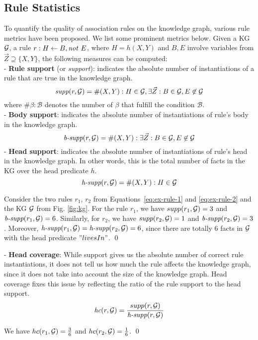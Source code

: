 \subsection{Rule Statistics}
To quantify the quality of association rules on the knowledge graph, various rule metrics have been proposed. We list some prominent metrics below. Given a KG $\mathcal{G}$, a rule $r : H \leftarrow B, \mathit{not}~ E$, where $H = h(X,Y)$ and $B,E$ involve variables from $\vec{Z}\supseteq \{X,Y\}$, the following measures can be computed:\\
- \textbf{Rule support} (or \textit{support}): indicates the absolute number of instantiations of a rule that are true in the knowledge graph.
\begin{equation}\label{eq:supp}
\textit{supp}(r,\mathcal{G}) = \#(X,Y): H \in \mathcal{G}, \exists \vec{Z}:B\in \mathcal{G},E \not \in \mathcal{G}\\
\end{equation}
where $\# \beta : \mathcal{B}$ denotes the number of $\beta$ that fulfill the condition $\mathcal{B}$.\\
- \textbf{Body support}: indicates the absolute number of instantiations of rule's body in the knowledge graph.
\begin{equation}\label{eq:body_supp}
\textit{b-supp}(r,\mathcal{G}) = \#(X,Y):\exists \vec{Z}:B\in \mathcal{G}, E \not \in \mathcal{G}
\end{equation}
- \textbf{Head support}: indicates the absolute number of instantiations of rule's head in the knowledge graph. In other words, this is the total number of facts in the KG over the head predicate $h$.
\begin{equation}\label{eq:head_supp}
\textit{h-supp}(r,\mathcal{G}) = \#(X,Y): H \in \mathcal{G}
\end{equation}
\begin{example}
Consider the two rules $r_1$, $r_2$ from Equations~\ref{eq:ex-rule-1} and \ref{eq:ex-rule-2} and the KG $\mathcal{G}$ from Fig. \ref{fig:kg}. For the rule $r_1$, we have $supp(r_1,\mathcal{G})=3$ and $\textit{b-supp}(r_1,\mathcal{G}) = 6$. Similarly, for $r_2$, we have $supp(r_2,\mathcal{G})=1$ and $\textit{b-supp}(r_2,\mathcal{G}) = 3$. Moreover, $\textit{h-supp}(r_1,\mathcal{G}) = \textit{h-supp}(r_2,\mathcal{G}) = 6$, since there are totally 6 facts in $\mathcal{G}$ with the head predicate $"livesIn"$.
\qed
\end{example}
\noindent- \textbf{Head coverage}: While support gives us the absolute number of correct rule instantiations, it does not tell us how much the rule affects the knowledge graph, since it does not take into account the size of the knowledge graph. Head coverage fixes this issue by reflecting the ratio of the rule support to the head support.
\begin{equation}\label{eq:hc}
\textit{hc}(r,\mathcal{G}) = \frac{supp(r,\mathcal{G})}{\textit{h-supp}(r,\mathcal{G})}
\end{equation}
\begin{example}
We have $hc(r_1,\mathcal{G}) = \frac{3}{6}$ and $hc(r_2,\mathcal{G}) = \frac{1}{6}$.
\qed
\end{example}


